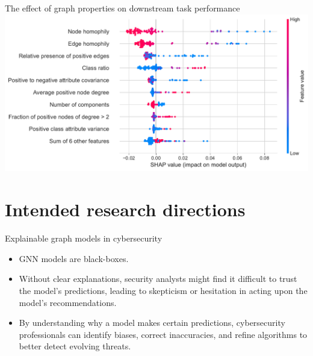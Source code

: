 \documentclass[10pt]{beamer}
\begin{document}
\begin{frame}{The effect of graph properties on downstream task performance}
	\includegraphics[width=\linewidth]{images/graph-property-importance.pdf}
\end{frame}

\section{Intended research directions}

\begin{frame}{Explainable graph models in cybersecurity}
	\begin{itemize}
		\item<1-> GNN models are black-boxes.
		\item<2-> Without clear explanations, security analysts might find it difficult to trust the model’s predictions, leading to skepticism or hesitation in acting upon the model’s recommendations.
		\item<3-> By understanding why a model makes certain predictions, cybersecurity professionals can identify biases, correct inaccuracies, and refine algorithms to better detect evolving threats.
	\end{itemize}

	\vspace{10pt}

\end{frame}
\end{document}
